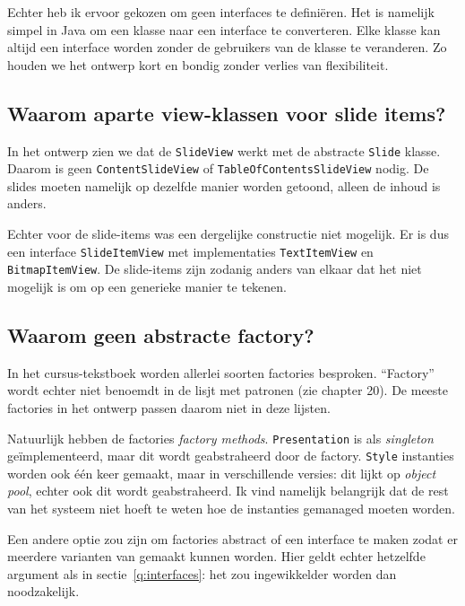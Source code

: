 \documentclass[a4paper]{article}
\newcommand{\question}[1]{
  \subsection{#1}
}
\newcommand{\code}[1]{\lstinline[columns=fixed]{#1}}
\begin{document}
		Echter heb ik ervoor gekozen om geen interfaces te definiëren.
		Het is namelijk simpel in Java om een klasse naar een interface te converteren.
		Elke klasse kan altijd een interface worden zonder de gebruikers van de klasse te veranderen.
		Zo houden we het ontwerp kort en bondig zonder verlies van flexibiliteit.

	\question{Waarom aparte view-klassen voor slide items?}
		In het ontwerp zien we dat de \code{SlideView} werkt met de abstracte \code{Slide} klasse.
		Daarom is geen \code{ContentSlideView} of \code{TableOfContentsSlideView} nodig.
		De slides moeten namelijk op dezelfde manier worden getoond, alleen de inhoud is anders.

		Echter voor de slide-items was een dergelijke constructie niet mogelijk.
		Er is dus een interface \code{SlideItemView} met implementaties \code{TextItemView} en \code{BitmapItemView}.
		De slide-items zijn zodanig anders van elkaar dat het niet mogelijk is om op een generieke manier te tekenen.

	\question{Waarom geen abstracte factory?}
		In het cursus-tekstboek worden allerlei soorten factories besproken.
		``Factory'' wordt echter niet benoemdt in de lisjt met patronen (zie chapter 20).
		De meeste factories in het ontwerp passen daarom niet in deze lijsten.

		Natuurlijk hebben de factories \textit{factory methods}.
		\code{Presentation} is als \textit{singleton} geïmplementeerd, maar dit wordt geabstraheerd door de factory.
		\code{Style} instanties worden ook één keer gemaakt, maar in verschillende versies: dit lijkt op \textit{object pool}, echter ook dit wordt geabstraheerd.
		Ik vind namelijk belangrijk dat de rest van het systeem niet hoeft te weten hoe de instanties gemanaged moeten worden.

		Een andere optie zou zijn om factories abstract of een interface te maken zodat er meerdere varianten van gemaakt kunnen worden.
		Hier geldt echter hetzelfde argument als in sectie~\ref{q:interfaces}: het zou ingewikkelder worden dan noodzakelijk.
\end{document}
